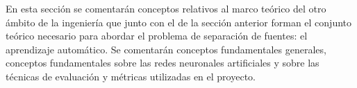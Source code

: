 En esta sección se comentarán conceptos relativos al marco teórico del otro ámbito de la ingeniería que junto con el de la sección anterior forman el conjunto teórico necesario para abordar el problema de separación de fuentes: el aprendizaje automático. Se comentarán conceptos fundamentales generales, conceptos fundamentales sobre las redes neuronales artificiales y sobre las técnicas de evaluación y métricas utilizadas en el proyecto.